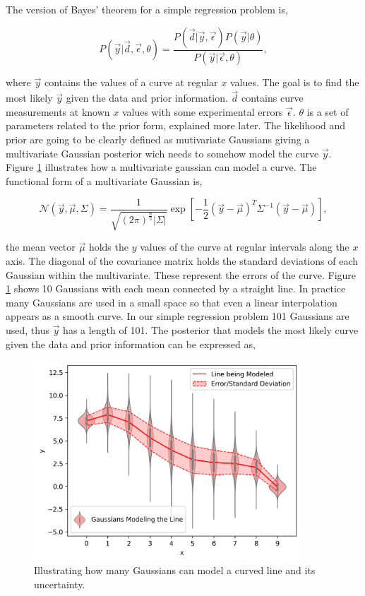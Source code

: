 The version of Bayes' theorem for a simple regression problem is,

\begin{equation} 
  P(\vec{y}|\vec{d},\vec \epsilon, \theta) = \frac{P(\vec{d}|\vec{y},\vec \epsilon) P(\vec y|\theta)}{P(\vec y|\vec \epsilon, \theta)},
  \label{eq:bayesth_simple_regression}
\end{equation}

\noindent where $\vec y$ contains the values of a curve at regular $x$ values. The goal is to find the most likely $\vec y$ given the data and prior information. $\vec d$ contains curve measurements at known $x$ values with some experimental errors $\vec \epsilon$. $\theta$ is a set of parameters related to the prior form, explained more later. The likelihood and prior are going to be clearly defined as mutivariate Gaussians giving a multivariate Gaussian posterior wich needs to somehow model the curve $\vec y$. Figure \ref{fig:mvg} illustrates how a multivariate gaussian can model a curve. The functional form of a multivariate Gaussian is,

\begin{equation}
  \mathcal{N}(\vec y, \vec{\mu}, \Sigma) = \frac{1}{\sqrt{(2\pi)^{\frac{n}{2}}|\Sigma|}} \exp \left[{{-\frac{1}{2}(\vec{y}-\vec{\mu})^T\Sigma^{-1}(\vec{y}-\vec{\mu})}}\right],
  \label{eq:mvg}
\end{equation}

\noindent the mean vector $\vec{\mu}$ holds the $y$ values of the curve at regular intervals along the $x$ axis. The diagonal of the covariance matrix holds the standard deviations of each Gaussian within the multivariate. These represent the errors of the curve. Figure \ref{fig:mvg} shows 10 Gaussians with each mean connected by a straight line. In practice many Gaussians are used in a small space so that even a linear interpolation appears as a smooth curve. In our simple regression problem 101 Gaussians are used, thus $\vec y$ has a length of 101. The posterior that models the most likely curve given the data and prior information can be expressed as,

\begin{figure}
  \centering
  \includegraphics[width=10cm]{images/mvg.png}
  \caption{Illustrating how many Gaussians can model a curved line and its uncertainty.}
  \label{fig:mvg}
\end{figure}

